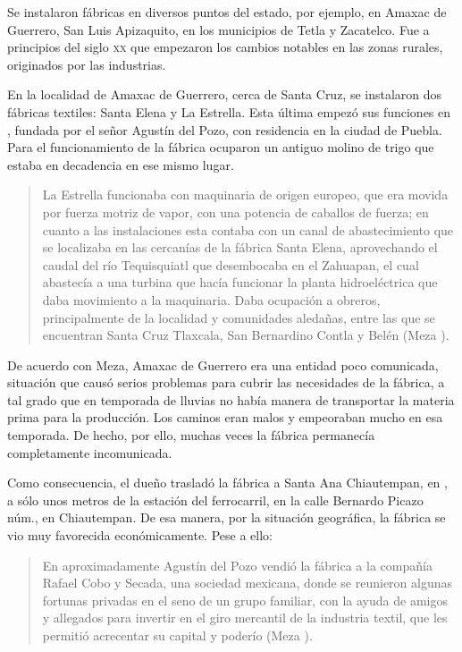 \documentclass[14pt,letterpaper,twoside]{extbook} %
\begin{document}
Se instalaron fábricas en diversos puntos del estado, por ejemplo, en Amaxac de Guerrero, San Luis Apizaquito, en los municipios de Tetla y Zacatelco. Fue a principios del siglo \textsc{xx} que empezaron los cambios notables en las zonas rurales, originados por las industrias.

En la localidad de Amaxac de Guerrero, cerca de Santa Cruz, se instalaron dos fábricas textiles: Santa Elena y La Estrella. Esta última empezó sus funciones en , fundada por el señor Agustín del Pozo, con residencia en la ciudad de Puebla. Para el funcionamiento de la fábrica ocuparon un antiguo molino de trigo que estaba en decadencia en ese mismo lugar.

\begin{quotation}
\noindent La Estrella funcionaba con maquinaria de origen europeo, que era movida por fuerza motriz de vapor, con una potencia de  caballos de fuerza; en cuanto a las instalaciones esta contaba con un canal de abastecimiento que se localizaba en las cercanías de la fábrica Santa Elena, aprovechando el caudal del río Tequisquiatl que desembocaba en el Zahuapan, el cual abastecía a una turbina que hacía funcionar la planta hidroeléctrica que daba movimiento a la maquinaria. Daba ocupación a  obreros, principalmente de la localidad y comunidades aledañas, entre las que se encuentran Santa Cruz Tlaxcala, San Bernardino Contla y Belén (Meza ).
\end{quotation}

\noindent De acuerdo con Meza, Amaxac de Guerrero era una entidad poco comunicada, situación que causó serios problemas para cubrir las necesidades de la fábrica, a tal grado que en temporada de lluvias no había manera de transportar la materia prima para la producción. Los caminos eran malos y empeoraban mucho en esa temporada. De hecho, por ello, muchas veces la fábrica permanecía completamente incomunicada.

Como consecuencia, el dueño trasladó la fábrica a Santa Ana Chiautempan, en , a sólo unos metros de la estación del ferrocarril, en la calle Bernardo Picazo núm.\thinspace{}, en Chiautempan. De esa manera, por la situación geográfica, la fábrica se vio muy favorecida económicamente. Pese a ello:

\begin{quotation}
\noindent En  aproximadamente Agustín del Pozo vendió la fábrica a la compañía Rafael Cobo y Secada, una sociedad mexicana, donde se reunieron algunas fortunas privadas en el seno de un grupo familiar, con la ayuda de amigos y allegados para invertir en el giro mercantil de la industria textil, que les permitió acrecentar su capital y poderío (Meza ).
\end{quotation}
\end{document}
